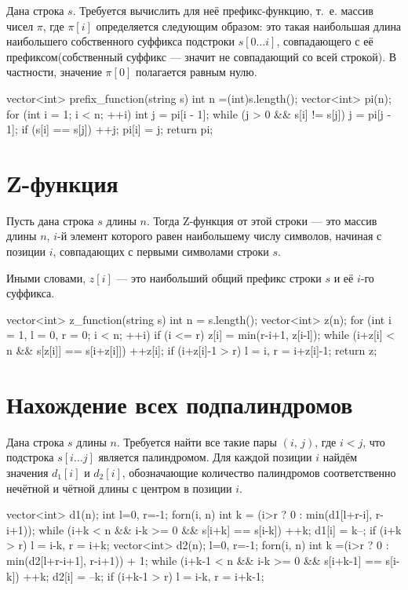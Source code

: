 \documentclass[12pt, titlepage]{article}
\begin{document}
Дана строка $s$. Требуется вычислить для неё префикс-функцию, т.~е. массив чисел $\pi$, где $\pi[i]$ определяется следующим образом: это такая наибольшая длина наибольшего собственного суффикса подстроки $s[0 \ldots i]$, совпадающего с её префиксом(собственный суффикс — значит не совпадающий со всей строкой). В частности, значение $\pi[0]$ полагается равным нулю.

\begin{cppcode}
vector<int> prefix_function(string s)
{
    int n =(int)s.length();
    vector<int> pi(n);
    for (int i = 1; i < n; ++i)
    {
        int j = pi[i - 1];
        while (j > 0 && s[i] != s[j])
            j = pi[j - 1];
        if (s[i] == s[j]) ++j;
        pi[i] = j;
    }
    return pi;
}
\end{cppcode}



\section{Z-функция}

Пусть дана строка $s$ длины $n$. Тогда Z-функция от этой строки — это массив длины $n$, $i$-й элемент которого равен наибольшему числу символов, начиная с позиции $i$, совпадающих с первыми символами строки $s$.

Иными словами, $z[i]$ — это наибольший общий префикс строки $s$ и её $i$-го суффикса.

\begin{cppcode}
vector<int> z_function(string s) {
    int n = s.length();
    vector<int> z(n);
    for (int i = 1, l = 0, r = 0; i < n; ++i) {
        if (i <= r)
            z[i] = min(r-i+1, z[i-l]);
        while (i+z[i] < n && s[z[i]] == s[i+z[i]])
            ++z[i];
        if (i+z[i]-1 > r)
            l = i,  r = i+z[i]-1;
    }
    return z;
}
\end{cppcode}

\section{Нахождение всех подпалиндромов}

Дана строка $s$ длины $n$. Требуется найти все такие пары $(i,\,j)$, где $i<j$, что подстрока $s[i\ldots j]$ является палиндромом. Для каждой позиции $i$ найдём значения $d_1[i]$ и $d_2[i]$, обозначающие количество палиндромов соответственно нечётной и чётной длины с центром в позиции $i$.

\begin{cppcode}
vector<int> d1(n);
int l=0, r=-1;
forn(i, n) {
    int k = (i>r ? 0 : min(d1[l+r-i], r-i+1));
    while (i+k < n && i-k >= 0 && s[i+k] == s[i-k])  ++k;
    d1[i] = k--;
    if (i+k > r)
        l = i-k,  r = i+k;
}
vector<int> d2(n);
l=0, r=-1;
forn(i, n) {
    int k =(i>r ? 0 : min(d2[l+r-i+1], r-i+1)) + 1;
    while (i+k-1 < n && i-k >= 0 && s[i+k-1] == s[i-k])  ++k;
    d2[i] = --k;
    if (i+k-1 > r)
        l = i-k, r = i+k-1;
}
\end{cppcode}
\end{document}
